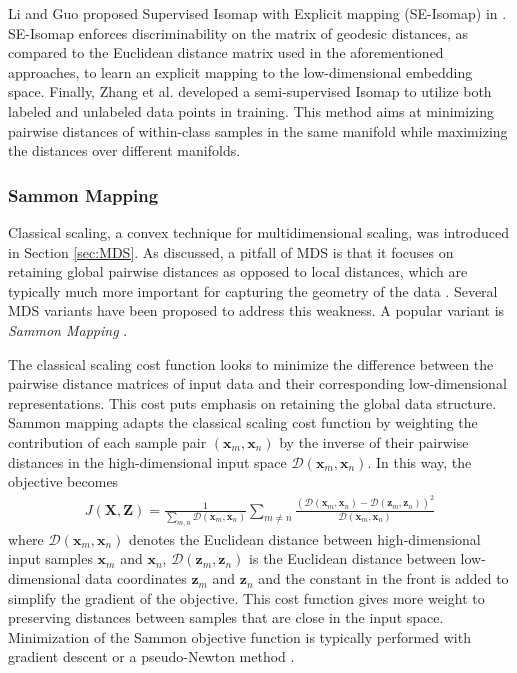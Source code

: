Li and Guo proposed Supervised Isomap with Explicit mapping (SE-Isomap) in \citep{Li2006SupervisedIsomap}.  SE-Isomap enforces discriminability on the matrix of geodesic distances, as compared to the Euclidean distance matrix used in the aforementioned approaches, to learn an explicit mapping to the low-dimensional embedding space.  Finally, Zhang et al. \citep{Zhang2018IsomapMultiManifold} developed a semi-supervised Isomap to utilize both labeled and unlabeled data points in training.  This method aims at minimizing pairwise distances of within-class samples in the same manifold while maximizing the distances over different manifolds.

\subsubsection{Sammon Mapping} \label{sec:sammon_mapping}
Classical scaling, a convex technique for multidimensional scaling, was introduced in Section \ref{sec:MDS}.  As discussed, a pitfall of MDS is that it focuses on retaining global pairwise distances as opposed to local distances, which are typically much more important for capturing the geometry of the data \citep{VanDerMaaten2009DRReview}.  Several MDS variants have been proposed to address this weakness.  A popular variant is \textit{Sammon Mapping} \citep{Sammon1966SammonMapping}.

The classical scaling cost function looks to minimize the difference between the pairwise distance matrices of input data and their corresponding low-dimensional representations.  This cost puts emphasis on retaining the global data structure.  Sammon mapping adapts the classical scaling cost function by weighting the contribution of each sample pair $(\bm{x}_{m},\bm{x}_{n})$ by the inverse of their pairwise distances in the high-dimensional input space $\mathcal{D}(\bm{x}_{m},\bm{x}_{n})$.  In this way, the objective becomes
\begin{align}
	J(\bm{X},\bm{Z}) = \frac{1}{\sum_{m,n}\mathcal{D}(\bm{x}_{m},\bm{x}_{n})}\sum_{m \neq n} \frac{(\mathcal{D}(\bm{x}_{m},\bm{x}_{n}) - \mathcal{D}(\bm{z}_{m},\bm{z}_{n}))^{2}}{\mathcal{D}(\bm{x}_{m},\bm{x}_{n})}
\end{align}
\noindent
where $\mathcal{D}(\bm{x}_{m},\bm{x}_{n})$ denotes the Euclidean distance between high-dimensional input samples $\bm{x}_{m}$ and $\bm{x}_{n}$, $\mathcal{D}(\bm{z}_{m},\bm{z}_{n})$ is the Euclidean distance between low-dimensional data coordinates $\bm{z}_{m}$ and $\bm{z}_{n}$ and the constant in the front is added to simplify the gradient of the objective.  This cost function gives more weight to preserving distances between samples that are close in the input space.   Minimization of the Sammon objective function is typically performed with gradient descent or a pseudo-Newton method \citep{Sorzano2014DRReview}.

